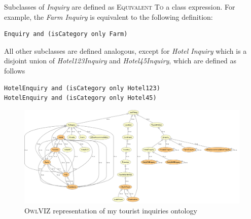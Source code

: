 Subclasses of \textit{Inquiry} are defined as \textsc{Equivalent To} a class expression. For example, the \textit{Farm Inquiry} is equivalent to the following definition:
\begin{lstlisting}
Enquiry and (isCategory only Farm)
\end{lstlisting}
All other subclasses are defined analogous, except for \textit{Hotel Inquiry} which is a disjoint union of \textit{Hotel123Inquiry} and \textit{Hotel45Inquiry}, which are defined as follows
\begin{lstlisting}
HotelEnquiry and (isCategory only Hotel123)
HotelEnquiry and (isCategory only Hotel45)
\end{lstlisting}

\begin{figure}
	\centering
	\includegraphics[width=\textwidth]{img/ontology.png}
	\caption{\textsc{OwlVIZ} representation of my tourist inquiries ontology}
	\label{fig:ontology}
\end{figure}




